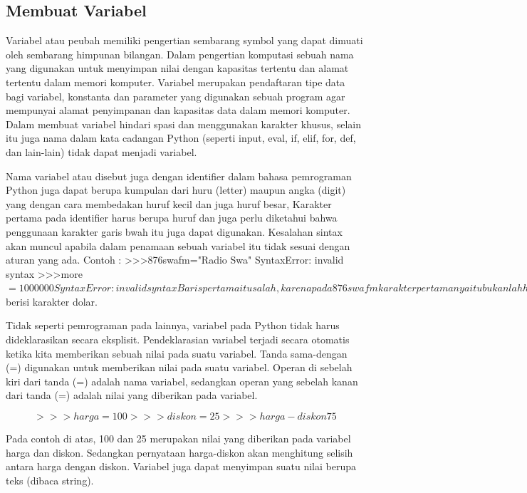 \subsection{Membuat Variabel}
Variabel atau peubah memiliki pengertian sembarang symbol yang dapat dimuati oleh sembarang himpunan bilangan. Dalam pengertian komputasi sebuah nama yang digunakan untuk menyimpan nilai dengan kapasitas tertentu dan alamat tertentu dalam memori komputer. Variabel merupakan pendaftaran tipe data bagi variabel, konstanta dan parameter yang digunakan sebuah program agar mempunyai alamat penyimpanan dan kapasitas data dalam memori komputer. Dalam membuat variabel hindari spasi dan menggunakan karakter khusus, selain itu juga nama dalam kata cadangan Python (seperti input, eval, if, elif, for, def, dan lain-lain) tidak dapat menjadi variabel.\cite{irfani2016bahan}

Nama variabel atau disebut juga dengan identifier dalam bahasa pemrograman Python juga dapat berupa kumpulan dari huru (letter) maupun angka (digit) yang dengan cara membedakan huruf kecil dan juga huruf besar, Karakter pertama pada identifier harus berupa huruf dan juga perlu diketahui bahwa penggunaan karakter garis bwah itu juga dapat digunakan.
Kesalahan sintax akan muncul apabila dalam penamaan sebuah variabel itu tidak sesuai dengan aturan yang ada.
Contoh :
>>>876swafm="Radio Swa"
SyntaxError: invalid syntax
>>>more$=1000000
SyntaxError: invalid syntax
Baris pertama itu salah, karena pada 876swafm karakter pertamanya itu bukanlah huruf. Pada baris ketiga juga salah karena pada more$ berisi karakter dolar.

Tidak seperti pemrograman pada lainnya, variabel pada Python tidak harus dideklarasikan secara eksplisit. Pendeklarasian variabel terjadi secara otomatis ketika kita memberikan sebuah nilai pada suatu variabel. Tanda sama-dengan (=) digunakan untuk memberikan nilai pada suatu variabel. Operan di sebelah kiri dari tanda (=) adalah nama variabel, sedangkan operan yang sebelah kanan dari tanda (=) adalah nilai yang diberikan pada variabel.\cite{utamipemrograman}

\begin{equation}
>>>harga = 100
>>>diskon = 25
>>>harga - diskon
75
\end{equation}

Pada contoh di atas, 100 dan 25 merupakan nilai yang diberikan pada variabel harga dan diskon. Sedangkan pernyataan harga-diskon akan menghitung selisih antara harga dengan diskon. Variabel juga dapat menyimpan suatu nilai berupa teks (dibaca string).

